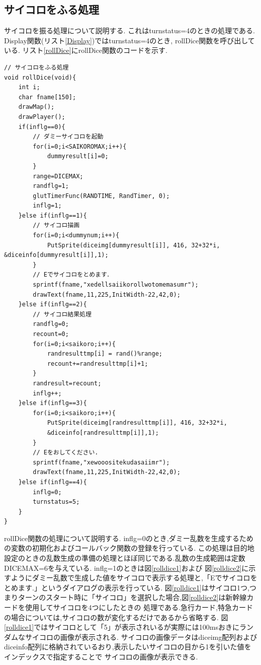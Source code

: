 \documentclass[a4j]{jarticle}
\begin{document}
    \subsection{サイコロをふる処理}
    サイコロを振る処理について説明する. これはturnstatus=4のときの処理である.
    Display関数(リスト\ref{Display})ではturnstatus=4のとき, rollDice関数を呼び出している.
    リスト\ref{rollDice}にrollDice関数のコードを示す.
        \begin{lstlisting}[basicstyle=\ttfamily\footnotesize, frame=single,label=rollDice,caption=rollDice関数]
// サイコロをふる処理
void rollDice(void){
    int i;
    char fname[150];
    drawMap();
    drawPlayer();    
    if(inflg==0){
        // ダミーサイコロを起動
        for(i=0;i<SAIKOROMAX;i++){
            dummyresult[i]=0;
        }
        range=DICEMAX;
        randflg=1;
        glutTimerFunc(RANDTIME, RandTimer, 0);
        inflg=1;
    }else if(inflg==1){
        // サイコロ描画
        for(i=0;i<dummynum;i++){
            PutSprite(diceimg[dummyresult[i]], 416, 32+32*i, &diceinfo[dummyresult[i]],1);
        }
        // Eでサイコロをとめます．
        sprintf(fname,"xedellsaiikorollwotomemasumr");
        drawText(fname,11,225,InitWidth-22,42,0);   
    }else if(inflg==2){
        // サイコロ結果処理
        randflg=0;
        recount=0;
        for(i=0;i<saikoro;i++){
            randresulttmp[i] = rand()%range;
            recount+=randresulttmp[i]+1;
        }
        randresult=recount;
        inflg++;
    }else if(inflg==3){
        for(i=0;i<saikoro;i++){
            PutSprite(diceimg[randresulttmp[i]], 416, 32+32*i, 
            &diceinfo[randresulttmp[i]],1);
        }       
        // Eをおしてください.
        sprintf(fname,"xewooositekudasaiimr");
        drawText(fname,11,225,InitWidth-22,42,0);
    }else if(inflg==4){
        inflg=0;
        turnstatus=5;
    }
}
        \end{lstlisting}

        rollDice関数の処理について説明する. inflg=0のとき,ダミー乱数を生成するための変数の初期化およびコールバック関数の登録を行っている.
        この処理は目的地設定のときの乱数生成の準備の処理とほぼ同じである.乱数の生成範囲は定数DICEMAX=6を与えている. inflg=1のときは図\ref{rolldice1}および
        図\ref{rolldice2}に示すようにダミー乱数で生成した値をサイコロで表示する処理と,「Eでサイコロをとめます.」というダイアログの表示を行っている.
        図\ref{rolldice1}はサイコロ1つ,つまりターンのスタート時に「サイコロ」を選択した場合,図\ref{rolldice2}は新幹線カードを使用してサイコロを4つにしたときの
        処理である.急行カード,特急カードの場合については,サイコロの数が変化するだけであるから省略する.
        図\ref{rolldice1}ではサイコロとして「5」が表示されいるが実際には100msおきにランダムなサイコロの画像が表示される.
        サイコロの画像データはdiceimg配列およびdiceinfo配列に格納されているおり,表示したいサイコロの目から1を引いた値をインデックスで指定することで
        サイコロの画像が表示できる.
\end{document}
